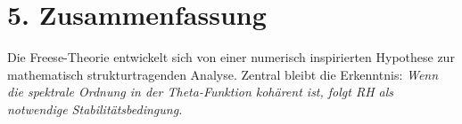 \documentclass[12pt]{article}
\begin{document}
\section*{5. Zusammenfassung}

Die Freese-Theorie entwickelt sich von einer numerisch inspirierten Hypothese zur mathematisch strukturtragenden Analyse.  
Zentral bleibt die Erkenntnis:  
\emph{Wenn die spektrale Ordnung in der Theta-Funktion kohärent ist, folgt RH als notwendige Stabilitätsbedingung.}
\end{document}
